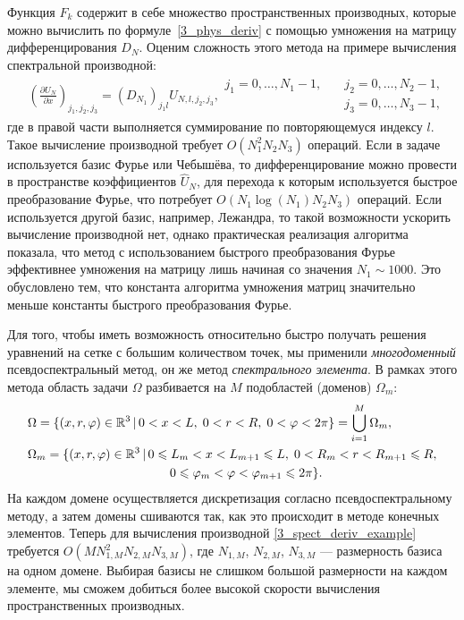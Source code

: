 \documentclass[12pt, a4paper]{report}
\newcommand{\lb}{\left (}
\newcommand{\rb}{\right )}
\newcommand{\pdiff}[2]{\frac{\partial #1}{\partial #2}}
\begin{document}
Функция $F_k$ содержит в себе множество пространственных производных, которые можно вычислить по формуле~\eqref{3_phys_deriv} с помощью умножения на матрицу дифференцирования $D_N$. Оценим сложность этого метода на примере вычисления спектральной производной:
\begin{align} \label{3_spect_deriv_example}
&\lb\pdiff{U_N}{x}\rb_{j_1, j_2, j_3} = \lb D_{N_1}\rb_{j_1 l} U_{N,l,j_2,j_3},
\begin{split} 
j_1 = 0,\dots, N_1-1, \quad &j_2 = 0,\dots, N_2-1,\\
&j_3 = 0,\dots, N_3-1,
\end{split}
\end{align}
где в правой части выполняется суммирование по повторяющемуся индексу $l$. Такое вычисление производной требует $O(N_1^2N_2N_3)$ операций. Если в задаче используется базис Фурье или Чебышёва, то дифференцирование можно провести в пространстве коэффициентов $\widehat{U}_N$, для перехода к которым используется быстрое преобразование Фурье, что потребует $O\lb N_1\log(N_1) N_2 N_3\rb$ операций. Если используется другой базис, например, Лежандра, то такой возможности ускорить вычисление производной нет, однако практическая реализация алгоритма показала, что метод с использованием быстрого преобразования Фурье эффективнее умножения на матрицу лишь начиная со значения $N_1 \sim 1000$. Это обусловлено тем, что константа алгоритма умножения матриц значительно меньше константы быстрого преобразования Фурье.

Для того, чтобы  иметь возможность относительно быстро получать решения уравнений на сетке с большим количеством точек, мы применили \emph{многодоменный} псевдоспектральный метод, он же метод \emph{спектрального элемента}.
В рамках этого метода область задачи $\Omega$ разбивается на $M$ подобластей (доменов) $\Omega_m$:
\begin{align*}
&\Omega = \{(x,r,\varphi)\in\mathbb{R}^3 \, | \, 0<x<L, \; 0<r<R, \; 0<\varphi<2\pi\} = \bigcup\limits_{i=1}^{M} \Omega_m,\\
&\Omega_m = \{(x,r,\varphi)\in\mathbb{R}^3 \, | \, 0\leqslant L_{m}<x<L_{m+1}\leqslant L, \; 0<R_m<r<R_{m+1}\leqslant R, \\
&\hspace{40mm} 0\leqslant \varphi_m<\varphi<\varphi_{m+1}\leqslant 2\pi\}.
\end{align*}
На каждом домене осуществляется дискретизация согласно псевдоспектральному методу, а затем домены сшиваются так, как это происходит в методе конечных элементов. Теперь для вычисления производной \eqref{3_spect_deriv_example} требуется $O(M N_{1,M}^2 N_{2,M} N_{3,M})$, где $N_{1,M}$, $N_{2,M}$, $N_{3,M}$ --- размерность базиса на одном домене. Выбирая базисы не слишком большой размерности на каждом элементе, мы сможем добиться более высокой скорости вычисления пространственных производных.
\end{document}
